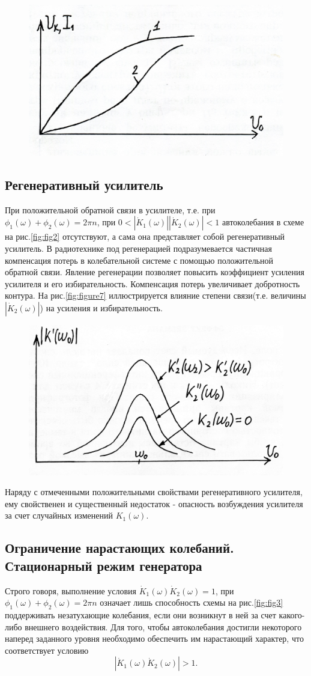 \begin{figure}[h]
	\centering
	\includegraphics[width=0.4\linewidth]{circuit/fig6}
	\caption{}
	\label{fig:fig6}
\end{figure}

\subsection{Регенеративный усилитель}
При положительной обратной связи в усилителе, т.е. при $\phi_1(\omega)+\phi_2(\omega)=2\pi n$, при $0<|\dot{K}_1(\omega)||\dot{K}_2(\omega)|<1$ автоколебания в схеме на рис.\ref{fig:fig2} отсутствуют, а сама она представляет собой регенеративный усилитель. В радиотехнике под регенерацией подразумевается частичная компенсация потерь в колебательной системе с помощью положительной обратной связи. Явление регенерации позволяет повысить коэффициент усиления усилителя и его избирательность. Компенсация потерь увеличивает добротность контура. На рис.\ref{fig:figure7} иллюстрируется влияние степени связи(т.е. величины $|\dot{K}_2(\omega)|$) на усиления и избирательность.

\begin{figure}[h]
	\centering
	\includegraphics[width=0.4\linewidth]{circuit/fig7}
	\caption{}
	\label{fig:fig7}
\end{figure}

Наряду с отмеченными положительными свойствами регенеративного усилителя, ему свойственен и существенный недостаток - опасность возбуждения усилителя за счет случайных изменений $K_1(\omega)$.

\subsection{Ограничение нарастающих колебаний. Стационарный режим генератора} 
Строго говоря, выполнение условия $\dot{K}_1(\omega)\dot{K}_2(\omega)=1$, при $\phi_1(\omega)+\phi_2(\omega)=2\pi n$ означает лишь способность схемы на рис.\ref{fig:fig3} поддерживать незатухающие колебания, если они возникнут в ней за счет какого-либо внешнего воздействия. Для того, чтобы автоколебания достигли некоторого наперед заданного уровня необходимо обеспечить им нарастающий характер, что соответствует условию
\begin{equation*}
|\dot{K}_1(\omega)\dot{K}_2(\omega)|>1.
\end{equation*}

